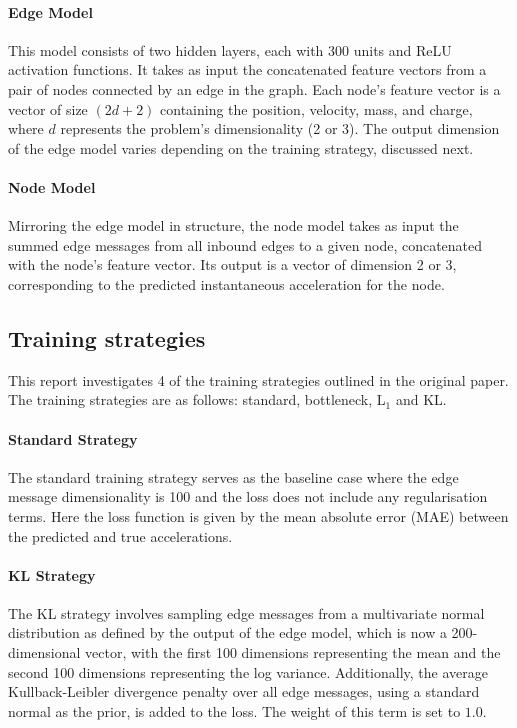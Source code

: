 \documentclass[11pt]{article}
\begin{document}
\paragraph*{Edge Model} This model consists of two hidden layers, each with 300 units and ReLU activation functions. It takes as input the concatenated feature vectors from a pair of nodes connected by an edge in the graph. Each node's feature vector is a vector of size $(2d+2)$ containing the position, velocity, mass, and charge, where $d$ represents the problem's dimensionality (2 or 3). The output dimension of the edge model varies depending on the training strategy, discussed next.

\paragraph*{Node Model} Mirroring the edge model in structure, the node model takes as input the summed edge messages from all inbound edges to a given node, concatenated with the node's feature vector. Its output is a vector of dimension 2 or 3, corresponding to the predicted instantaneous acceleration for the node.
\subsection{Training strategies}
This report investigates 4 of the training strategies outlined in the original paper. The training strategies are as follows: standard, bottleneck, L$_1$ and KL. 

\paragraph*{Standard Strategy}
The standard training strategy serves as the baseline case where the edge message dimensionality is 100 and the loss does not include any regularisation terms. Here the loss function is given by the mean absolute error (MAE) between the predicted and true accelerations.

\paragraph*{KL Strategy}
The KL strategy involves sampling edge messages from a multivariate normal distribution as defined by the output of the edge model, which is now a 200-dimensional vector, with the first 100 dimensions representing the mean and the second 100 dimensions representing the log variance. Additionally, the average Kullback-Leibler divergence penalty over all edge messages, using a standard normal as the prior, is added to the loss. The weight of this term is set to \(1.0 \).
\end{document}
